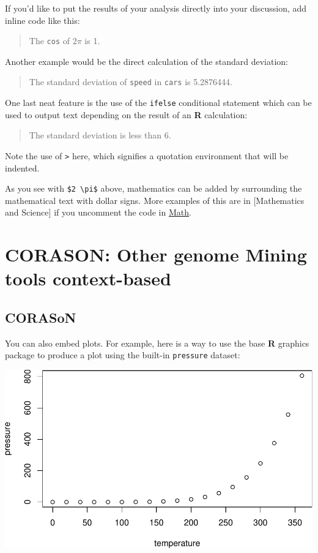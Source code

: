 \documentclass[12pt,twoside]{reedthesis}
\begin{document}
  If you'd like to put the results of your analysis directly into your
  discussion, add inline code like this:
  
  \begin{quote}
  The \texttt{cos} of \(2 \pi\) is 1.
  \end{quote}
  
  Another example would be the direct calculation of the standard
  deviation:
  
  \begin{quote}
  The standard deviation of \texttt{speed} in \texttt{cars} is 5.2876444.
  \end{quote}
  
  One last neat feature is the use of the \texttt{ifelse} conditional
  statement which can be used to output text depending on the result of an
  \textbf{R} calculation:
  
  \begin{quote}
  The standard deviation is less than 6.
  \end{quote}
  
  Note the use of \texttt{\textgreater{}} here, which signifies a
  quotation environment that will be indented.
  
  As you see with \texttt{\$2\ \textbackslash{}pi\$} above, mathematics
  can be added by surrounding the mathematical text with dollar signs.
  More examples of this are in {[}Mathematics and Science{]} if you
  uncomment the code in \protect\hyperlink{math}{Math}.
  
  \section{CORASON: Other genome Mining tools
  context-based}\label{corason-other-genome-mining-tools-context-based}
  
  \subsection{CORASoN}\label{corason}
  
  You can also embed plots. For example, here is a way to use the base
  \textbf{R} graphics package to produce a plot using the built-in
  \texttt{pressure} dataset:
  
  \begin{center}\includegraphics{tesis_files/figure-latex/pressure-1} \end{center}
  
\end{document}
